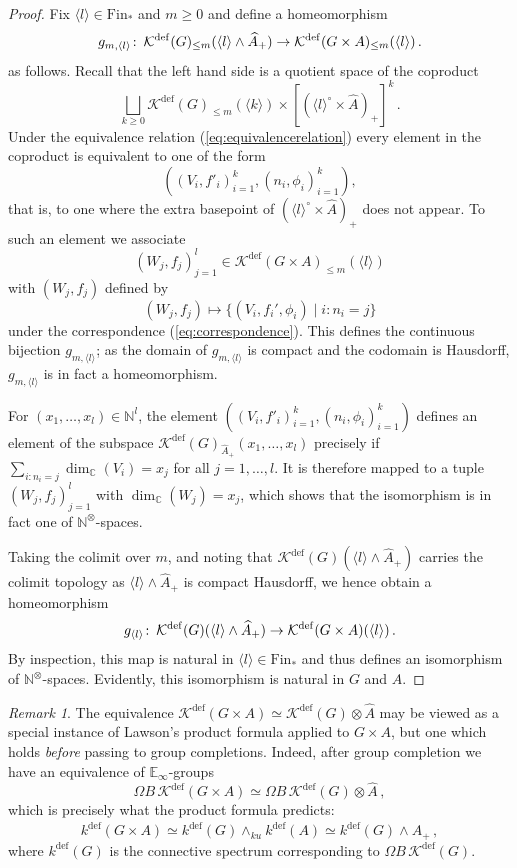 \documentclass[oneside, a4paper, 12pt]{article}
\numberwithin{equation}{section}
\newcommand{\Kdef}{\mathcal{K}^{\mathrm{def}}}
\newcommand{\Fin}{\mathrm{Fin}}
\newcommand{\C}{\mathbb{C}}
\newcommand{\N}{\mathbb{N}}
\newcommand{\co}{\colon\thinspace}
\theoremstyle{plain}
\theoremstyle{definition}
\theoremstyle{remark}
\newtheorem{remark}[theorem]{Remark}
\begin{document}
\begin{proof}
Fix $\langle l\rangle \in \Fin_\ast$ and $m\geq 0$ and define a homeomorphism
\[
g_{m,\langle l\rangle}\co \Kdef(G)_{\leq m}(\langle l\rangle\wedge \widehat{A}_+) \to \Kdef(G\times A)_{\leq m}(\langle l\rangle)\,.
\]
as follows. Recall that the left hand side is a quotient space of the coproduct
\[
\bigsqcup_{k\geq 0} \Kdef(G)_{\leq m}(\langle k\rangle) \times [(\langle l \rangle^\circ \times \widehat{A})_{+}]^k\,.
\]
Under the equivalence relation (\ref{eq:equivalencerelation}) every element in the coproduct is equivalent to one of the form
\[
((V_i,f'_i)_{i=1}^k,(n_i,\phi_i)_{i=1}^k),
\]
that is, to one where the extra basepoint of $(\langle l\rangle^\circ \times \widehat{A})_+$ does not appear. To such an element we associate
\[
(W_j,f_j)_{j=1}^l \in \Kdef(G\times A)_{\leq m}(\langle l\rangle)
\]
with $(W_j,f_j)$ defined by
\[
(W_j,f_j) \mapsto \{(V_i,f_i',\phi_i)\mid i: n_i=j\}
\]
under the correspondence (\ref{eq:correspondence}). This defines the continuous bijection $g_{m,\langle l\rangle}$; as the domain of $g_{m,\langle l\rangle}$ is compact and the codomain is Hausdorff, $g_{m,\langle l\rangle}$ is in fact a homeomorphism.

For $(x_1,\dots,x_l)\in \N^l$, the element $((V_i,f'_i)_{i=1}^k,(n_i,\phi_i)_{i=1}^k)$ defines an element of the subspace $\Kdef(G)_{\widehat{A}_+}(x_1,\dots,x_l)$ precisely if $\sum_{i: n_i=j} \dim_{\C}(V_i)=x_j$ for all $j=1,\dots,l$. It is therefore mapped to a tuple $(W_j,f_j)_{j=1}^l$ with $\dim_{\C}(W_j)=x_j$, which shows that the isomorphism is in fact one of $\N^\otimes$-spaces.

Taking the colimit over $m$, and noting that $ \Kdef(G)(\langle l\rangle \wedge \widehat{A}_+)$ carries the colimit topology as $\langle l \rangle \wedge \widehat{A}_+$ is compact Hausdorff, we hence obtain a homeomorphism
\[
g_{\langle l\rangle}\co \Kdef(G)(\langle l \rangle\wedge \widehat{A}_+) \to \Kdef(G\times A)(\langle l \rangle)\, .
\]
By inspection, this map is natural in $\langle l \rangle\in \Fin_\ast$ and thus defines an isomorphism of $\N^\otimes$-spaces. Evidently, this isomorphism is natural in $G$ and $A$.
\end{proof}


\begin{remark} \label{rem:productformula}
The equivalence $\Kdef(G\times A)\simeq \Kdef(G)\otimes \widehat{A}$ may be viewed as a special instance of Lawson's product formula \cite{Lawson} applied to $G\times A$, but one which holds \emph{before} passing to group completions. Indeed, after group completion we have an equivalence of $\mathbb{E}_\infty$-groups
\[
\Omega B\, \Kdef(G\times A) \simeq \Omega B\, \Kdef(G) \otimes \widehat{A}\,,
\]
which is precisely what the product formula predicts:
\[
k^{\mathrm{def}}(G\times A)\simeq k^{\mathrm{def}}(G)\wedge_{ku} k^{\mathrm{def}}(A) \simeq k^{\mathrm{def}}(G)\wedge \widehat{A}_+\, ,
\]
where $k^{\mathrm{def}}(G)$ is the connective spectrum corresponding to $\Omega B\, \Kdef(G)$.
\end{remark}
\end{document}
